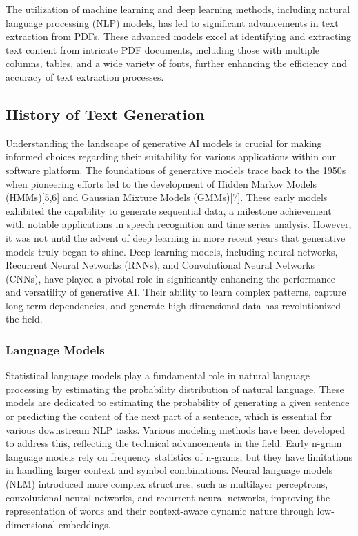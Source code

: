 \documentclass[conference]{IEEEtran}
\begin{document}
The utilization of machine learning and deep learning methods, including natural language processing (NLP) models, has led to significant advancements in text extraction from PDFs. These advanced models excel at identifying and extracting text content from intricate PDF documents, including those with multiple columns, tables, and a wide variety of fonts, further enhancing the efficiency and accuracy of text extraction processes.

\subsection{History of Text Generation}

Understanding the landscape of generative AI models is crucial for making informed choices regarding their suitability for various applications within our software platform. The foundations of generative models trace back to the 1950s when pioneering efforts led to the development of Hidden Markov Models (HMMs)[5,6] and Gaussian Mixture Models (GMMs)[7]. These early models exhibited the capability to generate sequential data, a milestone achievement with notable applications in speech recognition and time series analysis. However, it was not until the advent of deep learning in more recent years that generative models truly began to shine. Deep learning models, including neural networks, Recurrent Neural Networks (RNNs), and Convolutional Neural Networks (CNNs), have played a pivotal role in significantly enhancing the performance and versatility of generative AI. Their ability to learn complex patterns, capture long-term dependencies, and generate high-dimensional data has revolutionized the field.

\subsubsection{Language Models}

Statistical language models play a fundamental role in natural language processing by estimating the probability distribution of natural language. These models are dedicated to estimating the probability of generating a given sentence or predicting the content of the next part of a sentence, which is essential for various downstream NLP tasks. Various modeling methods have been developed to address this, reflecting the technical advancements in the field. Early n-gram language models rely on frequency statistics of n-grams, but they have limitations in handling larger context and symbol combinations. Neural language models (NLM) introduced more complex structures, such as multilayer perceptrons, convolutional neural networks, and recurrent neural networks, improving the representation of words and their context-aware dynamic nature through low-dimensional embeddings.
\end{document}
